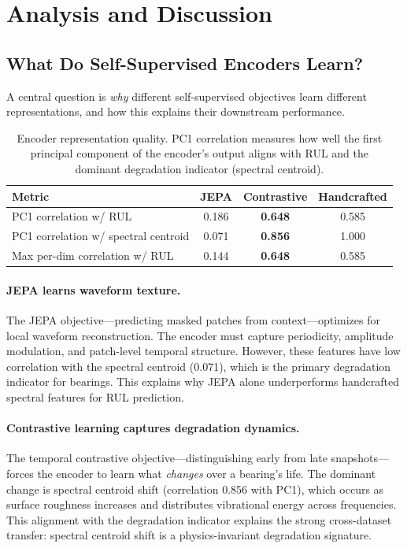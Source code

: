 \section{Analysis and Discussion}
\label{sec:analysis}

\subsection{What Do Self-Supervised Encoders Learn?}
\label{sec:encoder_analysis}

A central question is \emph{why} different self-supervised objectives learn different representations, and how this explains their downstream performance.

\begin{table}[t]
\centering
\caption{Encoder representation quality. PC1 correlation measures how well the first principal component of the encoder's output aligns with RUL and the dominant degradation indicator (spectral centroid).}
\label{tab:encoder}
\small
\begin{tabular}{@{}lccc@{}}
\toprule
Metric & JEPA & Contrastive & Handcrafted \\
\midrule
PC1 correlation w/ RUL & 0.186 & \textbf{0.648} & 0.585 \\
PC1 correlation w/ spectral centroid & 0.071 & \textbf{0.856} & 1.000 \\
Max per-dim correlation w/ RUL & 0.144 & \textbf{0.648} & 0.585 \\
\bottomrule
\end{tabular}
\end{table}

\paragraph{JEPA learns waveform texture.} The JEPA objective---predicting masked patches from context---optimizes for local waveform reconstruction. The encoder must capture periodicity, amplitude modulation, and patch-level temporal structure. However, these features have low correlation with the spectral centroid (0.071), which is the primary degradation indicator for bearings. This explains why JEPA alone underperforms handcrafted spectral features for RUL prediction.

\paragraph{Contrastive learning captures degradation dynamics.} The temporal contrastive objective---distinguishing early from late snapshots---forces the encoder to learn what \emph{changes} over a bearing's life. The dominant change is spectral centroid shift (correlation 0.856 with PC1), which occurs as surface roughness increases and distributes vibrational energy across frequencies. This alignment with the degradation indicator explains the strong cross-dataset transfer: spectral centroid shift is a physics-invariant degradation signature.

